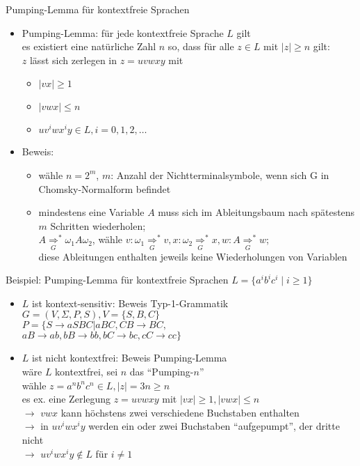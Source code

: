 \begin{frame}{Pumping-Lemma für kontextfreie Sprachen}
	\begin{itemize}
		\item Pumping-Lemma: für jede kontextfreie Sprache $L$ gilt\\
		es existiert eine natürliche Zahl $n$ so, dass für alle $z \in L$ mit $|z|\geq n$ gilt:\\
		$z$ lässt sich zerlegen in $z=uvwxy$ mit
		\begin{itemize}
			\item $|vx|\geq 1$
			\item $|vwx| \leq n$
			\item $uv^iwx^iy \in L, i=0, 1, 2, \ldots$
		\end{itemize}
		\item Beweis:
		\begin{itemize}
			\item wähle $n=2^m$, $m$: Anzahl der Nichtterminalsymbole, wenn sich G in Chomsky-Normalform befindet
			\item mindestens eine Variable $A$ muss sich im Ableitungsbaum nach spätestens $m$ Schritten wiederholen;\\
			$A\underset{G}{\Rightarrow}^*\omega_1 A \omega_2$, wähle $v: \omega_1 \underset{G}{\Rightarrow}^* v, x: \omega_2 \underset{G}{\Rightarrow}^* x, w: A \underset{G}{\Rightarrow}^* w$;\\
			diese Ableitungen enthalten jeweils keine Wiederholungen von Variablen
		\end{itemize}
	\end{itemize}
\end{frame}

\begin{frame}{Beispiel: Pumping-Lemma für kontextfreie Sprachen}
	$L=\{a^ib^ic^i \mid i\geq 1 \}$
	\begin{itemize}
		\item $L$ ist kontext-sensitiv: Beweis Typ-1-Grammatik\\
		$G=(V, \Sigma, P, S), V=\{S, B, C\}$\\
		$P=\{S\rightarrow aSBC | aBC, CB \rightarrow BC,$\\
		\qquad $aB \rightarrow ab, bB \rightarrow bb, bC \rightarrow bc, cC \rightarrow cc \}$
		\item $L$ ist nicht kontextfrei: Beweis Pumping-Lemma\\
		wäre $L$ kontextfrei, sei $n$ das "`Pumping-$n$"'\\
		wähle $z=a^nb^nc^n \in L, |z|=3n \geq n$\\
		es ex. eine Zerlegung $z=uvwxy$ mit $|vx|\geq 1, |vwx| \leq n$\\
		$\rightarrow$ $vwx$ kann höchstens zwei verschiedene Buchstaben enthalten\\
		$\rightarrow$ in $uv^iwx^iy$ werden ein oder zwei Buchstaben "`aufgepumpt"', der dritte nicht\\
		$\rightarrow$ $uv^iwx^iy \notin L$ für $i \neq 1$ \lightning 
	\end{itemize}
\end{frame}

